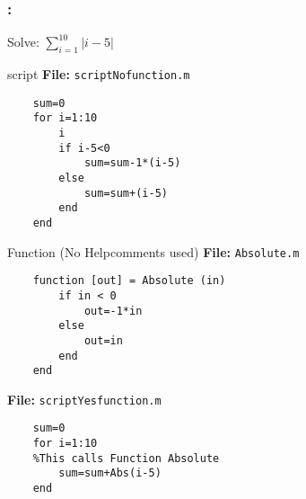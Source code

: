 \documentclass[11pt]{beamer}
\begin{document}
\begin{frame}[fragile]
	
	\frametitle{\secname : \subsecname}
	\vspace{-7pt}
	\begin{minipage}[t]{0.43\linewidth}
	\vspace{5pt}
	\centering
	\begin{minipage}{0.7\linewidth}
			\begin{block}{}
				Solve: $\sum_{i=1}^{10} \left|i-5\right|$
			\end{block}
	\end{minipage}
	\vspace{5pt}
	\begin{block}{script}
	\textbf{File:} \verb|scriptNofunction.m|
	\vspace{-7pt}
	\begin{verbatim}
	sum=0
	for i=1:10
	    i
	    if i-5<0
	        sum=sum-1*(i-5)
	    else
	        sum=sum+(i-5)
	    end
	end
	\end{verbatim}
	\end{block}
	\end{minipage}
	\hspace{5pt}
	\begin{minipage}[t]{0.53\linewidth}
	\vspace{-17pt}
	\begin{exampleblock}{Function (No Helpcomments used)}
	\textbf{File:} \verb|Absolute.m|
	\vspace{-7pt}	
	\begin{verbatim}
	function [out] = Absolute (in)
	    if in < 0
	        out=-1*in
	    else
	        out=in
	    end
	end   
	\end{verbatim}
	\end{exampleblock}
	\vspace{-1pt}
	\textbf{File:} \verb|scriptYesfunction.m|
	\vspace{-5pt}	
	\begin{verbatim}
	sum=0
	for i=1:10
	%This calls Function Absolute
	    sum=sum+Abs(i-5)
	end
	\end{verbatim}	
	\end{minipage}
	
\end{frame}
\end{document}
